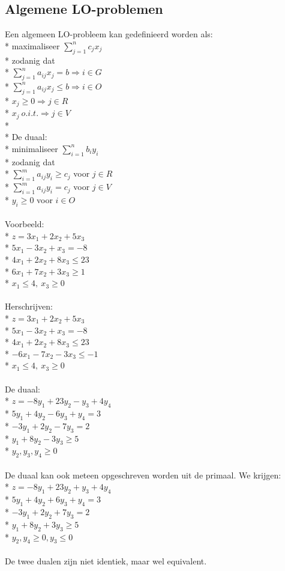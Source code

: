 \documentclass[10pt]{article}
\begin{document}
\subsection{Algemene LO-problemen}
Een algemeen LO-probleem kan gedefinieerd worden als:\\*
maximaliseer $\sum_{j=1}^nc_jx_j$\\*
zodanig dat\\*
$\sum_{j=1}^na_{ij}x_j = b \Rightarrow i \in G$\\*
$\sum_{j=1}^na_{ij}x_j \le b \Rightarrow i \in O$\\*
$x_j \ge 0 \Rightarrow j \in R$\\*
$x_j\ o.i.t. \Rightarrow j \in V$\\*\\*
De duaal:\\*
minimaliseer $\sum_{i=1}^nb_iy_i$\\*
zodanig dat\\*
$\sum_{i=1}^ma_{ij}y_i \ge c_j$ voor $j \in R$\\*
$\sum_{i=1}^ma_{ij}y_i = c_j$ voor $j \in V$\\*
$y_i \ge 0$ voor $i \in O$\\\\
Voorbeeld:\\*
$z = 3x_1 + 2 x_2 + 5x_3$\\*
$5x_1 - 3x_2 + x_3 = -8$\\*
$4x_1 + 2x_2 + 8x_3 \le 23$\\*
$6x_1 + 7x_2 + 3x_3 \ge 1$\\*
$x_1 \le 4,\ x_3 \ge 0$\\\\
Herschrijven:\\*
$z = 3x_1 + 2 x_2 + 5x_3$\\*
$5x_1 - 3x_2 + x_3 = -8$\\*
$4x_1 + 2x_2 + 8x_3 \le 23$\\*
$-6x_1 - 7x_2 - 3x_3 \le -1$\\*
$x_1 \le 4,\ x_3 \ge 0$\\\\
De duaal:\\*
$z = -8y_1 + 23y_2 - y_3 + 4y_4$\\*
$5y_1 + 4y_2 - 6y_3 + y_4 = 3$\\*
$-3y_1 + 2y_2 - 7y_3 = 2$\\*
$y_1 + 8y_2 - 3y_3 \ge 5$\\*
$y_2, y_3, y_4 \ge 0$\\\\
De duaal kan ook meteen opgeschreven worden uit de primaal. We krijgen:\\*
$z = -8y_1 + 23y_2 + y_3 + 4y_4$\\*
$5y_1 + 4y_2 + 6y_3 + y_4 = 3$\\*
$-3y_1 + 2y_2 + 7y_3 = 2$\\*
$y_1 + 8y_2 + 3y_3 \ge 5$\\*
$y_2, y_4 \ge 0, y_3 \le 0$\\\\
De twee dualen zijn niet identiek, maar wel equivalent.
\end{document}
